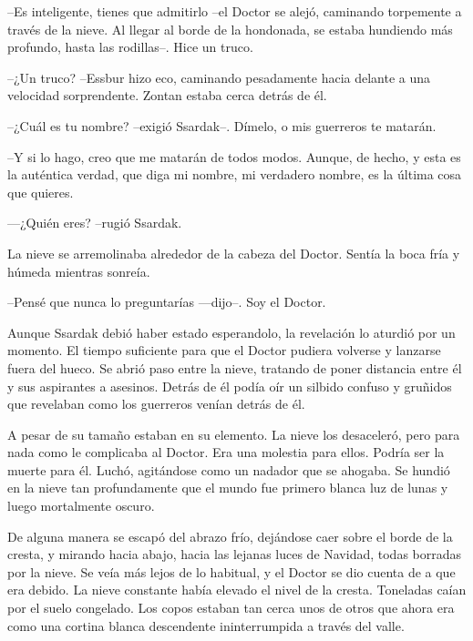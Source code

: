 --Es inteligente, tienes que admitirlo --el Doctor se alejó, caminando torpemente a través de la nieve. Al llegar al borde de la hondonada, se estaba hundiendo más profundo, hasta las rodillas--. Hice un truco.



--¿Un truco? --Essbur hizo eco, caminando pesadamente hacia delante a una velocidad sorprendente. Zontan estaba cerca detrás de él.



--¿Cuál es tu nombre? --exigió Ssardak--. Dímelo, o mis guerreros te matarán.



--Y si lo hago, creo que me matarán de todos modos. Aunque, de hecho, y esta es la auténtica verdad, que diga mi nombre, mi verdadero nombre, es la última cosa que quieres.



—¿Quién eres? --rugió Ssardak.



La nieve se arremolinaba alrededor de la cabeza del Doctor. Sentía la boca fría y húmeda mientras sonreía. 

--Pensé que nunca lo preguntarías —dijo--. Soy el Doctor.



Aunque Ssardak debió haber estado esperandolo, la revelación lo aturdió por un momento. El tiempo suficiente para que el Doctor pudiera volverse y lanzarse fuera del hueco. Se abrió paso entre la nieve, tratando de poner distancia entre él y sus aspirantes a asesinos. Detrás de él podía oír un silbido confuso y gruñidos que revelaban como los guerreros venían detrás de él.



A pesar de su tamaño estaban en su elemento. La nieve los desaceleró, pero para nada como le complicaba al Doctor. Era una molestia para ellos. Podría ser la muerte para él. Luchó, agitándose como un nadador que se ahogaba. Se hundió en la nieve tan profundamente que el mundo fue primero blanca luz de lunas y luego mortalmente oscuro.



De alguna manera se escapó del abrazo frío, dejándose caer sobre el borde de la cresta, y mirando hacia abajo, hacia las lejanas luces de Navidad, todas borradas por la nieve. Se veía más lejos de lo habitual, y el Doctor se dio cuenta de a que era debido. La nieve constante había elevado el nivel de la cresta. Toneladas caían por el suelo congelado. Los copos estaban tan cerca unos de otros que ahora era como una cortina blanca descendente ininterrumpida a través del valle.



